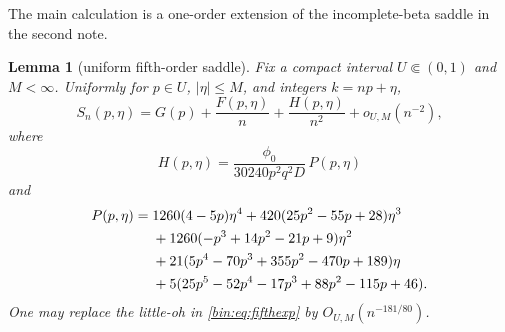 \documentclass[11pt,a4paper]{article}
\numberwithin{equation}{section}
\newtheorem{lemma}[theorem]{Lemma}
\theoremstyle{definition}
\theoremstyle{remark}
\newcommand{\phiZ}{\phi_0}
\begin{document}
The main calculation is a one-order extension of the incomplete-beta saddle
in the second note.

\begin{lemma}[uniform fifth-order saddle]\label{bin:lem:fifth}
Fix a compact interval $U\Subset(0,1)$ and $M<\infty$.  Uniformly for
$p\in U$, $|\eta|\le M$, and integers $k=np+\eta$,
\begin{equation}\label{bin:eq:fifthexp}
 S_n(p,\eta)
 =G(p)+\frac{F(p,\eta)}n+\frac{H(p,\eta)}{n^2}
 +o_{U,M}(n^{-2}),
\end{equation}
where
\begin{equation}\label{bin:eq:H}
 H(p,\eta)=\frac{\phiZ}{30240p^2q^2D}\,P(p,\eta)
\end{equation}
and
\begin{align}
 P(p,\eta)={}&1260(4-5p)\eta^4
 +420(25p^2-55p+28)\eta^3 \notag\\
 &+1260(-p^3+14p^2-21p+9)\eta^2 \notag\\
 &+21(5p^4-70p^3+355p^2-470p+189)\eta \notag\\
 &+5(25p^5-52p^4-17p^3+88p^2-115p+46).
 \label{bin:eq:P}
\end{align}
One may replace the little-oh in \eqref{bin:eq:fifthexp} by
$O_{U,M}(n^{-181/80})$.
\end{lemma}
\end{document}
